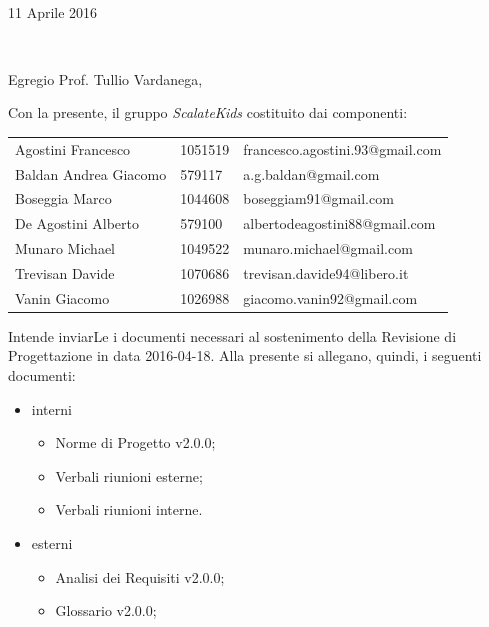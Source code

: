 \documentclass[10pt,a4paper]{letter} %
\makeatletter
\def\opening#1{\thispagestyle{empty}
  {\centering\fromaddress \vspace{0.6in} \\ %
    \hspace*{\longindentation}11 Aprile 2016\hspace*{\fill}\par} %
  {\raggedright \toname \\ \toaddress \par} %
  \vspace{0.4in} %
  \noindent #1 %
  \def\thefootnote{}
  \def\footnoterule{\hrule}
  \footnotetext{\hspace*{\fill}{\footnotesize\em ScalateKids - scalatekids@gmail.com}}
  \def\thefootnote{\arabic{footnote}}
}
\makeatother
\begin{document}

\begin{letter}{}


  \opening{Egregio Prof. Tullio Vardanega,\\}

  Con la presente, il gruppo \textit{ScalateKids} costituito dai componenti:
  \begin{center}
    \begin{tabular}[H]{l l l}
      Agostini Francesco & 1051519 & francesco.agostini.93@gmail.com \\
      Baldan Andrea Giacomo & 579117 & a.g.baldan@gmail.com \\
      Boseggia Marco & 1044608 & boseggiam91@gmail.com \\
      De Agostini Alberto & 579100 & albertodeagostini88@gmail.com \\
      Munaro Michael & 1049522 & munaro.michael@gmail.com \\
      Trevisan Davide & 1070686 & trevisan.davide94@libero.it \\
      Vanin Giacomo & 1026988 & giacomo.vanin92@gmail.com \\
    \end{tabular}
  \end{center}
  Intende inviarLe i documenti necessari al sostenimento della Revisione di Progettazione in data 2016-04-18.
  Alla presente si allegano, quindi, i seguenti documenti:
  \begin{itemize}
  \item interni
    \begin{itemize}
    \item Norme di Progetto v2.0.0;
    \item Verbali riunioni esterne;
    \item Verbali riunioni interne.
    \end{itemize}
  \item esterni
    \begin{itemize}
    \item Analisi dei Requisiti v2.0.0;
    \item Glossario v2.0.0;

\end{itemize}
\end{itemize}
\end{letter}
\end{document}
